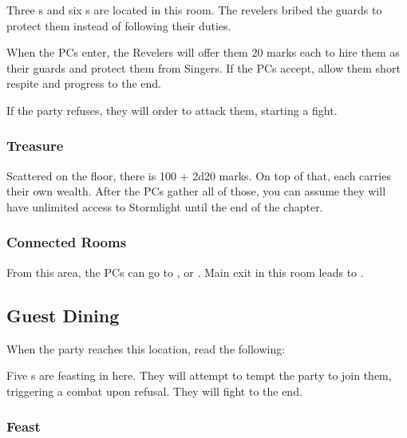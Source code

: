 Three \enemyRevelerWealthy{}s and six \enemyQueensGuard{}s are located in this room. The revelers bribed the guards to protect them instead of following their duties.

When the PCs enter, the Revelers will offer them 20 marks each to hire them as their guards and protect them from Singers. If the PCs accept, allow them short respite and progress  to the end.

If the party refuses, they will order \enemyQueensGuard{} to attack them, starting a fight.

\subsubsection{Treasure}

Scattered on the floor, there is 100 + 2d20 marks. On top of that, each \enemyRevelerWealthy{} carries their own wealth. After the PCs gather all of those, you can assume they will have unlimited access to Stormlight until the end of the chapter.

\subsubsection{Connected Rooms}

From this area, the PCs can go to ,  or . Main exit in this room leads to .




\subsection{Guest Dining}
\label{ssec:kholinarPalaceRoomsDining}

When the party reaches this location, read the following:


Five \enemyRevelerDrinking{}s are feasting in here. They will attempt to tempt the party to join them, triggering a combat upon refusal. They will fight to the end.

\subsubsection{Feast}

